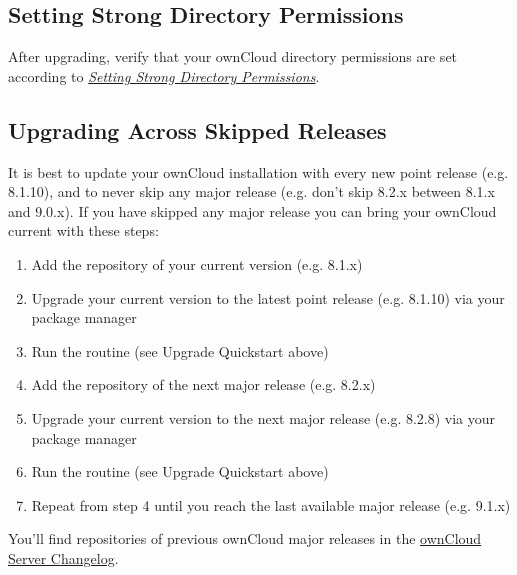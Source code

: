 \documentclass[letterpaper,10pt,english]{sphinxmanual}
\begin{document}
\subsection{Setting Strong Directory Permissions}
\label{maintenance/package_upgrade:setting-strong-directory-permissions}
After upgrading, verify that your ownCloud directory permissions are set
according to {\hyperref[installation/installation_wizard:strong-perms-label]{\emph{Setting Strong Directory Permissions}}}.


\subsection{Upgrading Across Skipped Releases}
\label{maintenance/package_upgrade:upgrading-across-skipped-releases}\label{maintenance/package_upgrade:skipped-release-upgrade-label}
It is best to update your ownCloud installation with every new point release (e.g. 8.1.10),
and to never skip any major release (e.g. don't skip 8.2.x between 8.1.x and 9.0.x). If you
have skipped any major release you can bring your ownCloud current with these steps:
\begin{enumerate}
\item {} 
Add the repository of your current version (e.g. 8.1.x)

\item {} 
Upgrade your current version to the latest point release (e.g. 8.1.10) via your package manager

\item {} 
Run the  routine (see Upgrade Quickstart above)

\item {} 
Add the repository of the next major release (e.g. 8.2.x)

\item {} 
Upgrade your current version to the next major release (e.g. 8.2.8) via your package manager

\item {} 
Run the  routine (see Upgrade Quickstart above)

\item {} 
Repeat from step 4 until you reach the last available major release (e.g. 9.1.x)

\end{enumerate}

You'll find repositories of previous ownCloud major releases in the \href{https://owncloud.org/changelog/}{ownCloud Server Changelog}.
\end{document}

